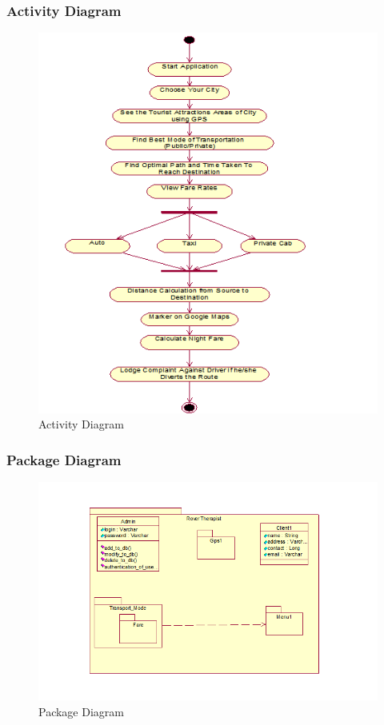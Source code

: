 \documentclass[12pt,a4paper]{article}
\begin{document}
{{{{{{\subsubsection{Activity Diagram}
\begin{figure}[!htb]
\centering
\includegraphics[width=15 cm]{activity}
\caption{Activity Diagram}
\end{figure}
\newpage
\subsubsection{Package Diagram}
\begin{figure}[!htb]
\centering
\includegraphics[width=15 cm]{package}
\caption{Package Diagram}
\end{figure}
\newpage
}}}}}}
\end{document}
